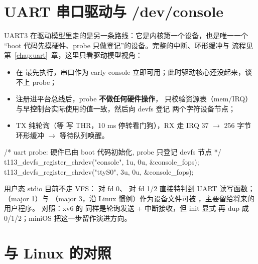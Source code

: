 \section{UART 串口驱动与 /dev/console}

UART3 在驱动模型里走的是另一条路线：它是内核第一个设备，也是唯一一个
``boot 代码先摸硬件、probe 只做登记''的设备。完整的中断、环形缓冲与
 流程见第~\ref{chap:uart}~章，这里只看驱动模型视角：

\begin{itemize}
  \item {} 在  最先执行，串口作为
        early console 立即可用；此时驱动核心还没起来，谈不上 probe；
  \item {} 注册进平台总线后，probe \textbf{不做任何硬件操作}，
        只校验资源表（mem/IRQ）与早控制台实际使用的值一致，然后向 devfs 登记
        两个字符设备节点；
  \item TX 纯轮询（等  写 THR，10 ms 停转看门狗），RX 走
        IRQ 37 $\rightarrow$ 256 字节环形缓冲 $\rightarrow$ 等待队列唤醒。
\end{itemize}

\begin{ccode}
/* uart probe: 硬件已由 boot 代码初始化, probe 只登记 devfs 节点 */
t113_devfs_register_chrdev("console", 1u, 0u, &console_fops);
t113_devfs_register_chrdev("ttyS0",   3u, 0u, &console_fops);
\end{ccode}

用户态 stdio 目前不走 VFS： 对 fd 0、 对 fd 1/2
直接特判到 UART 读写函数；（major 1）与 
（major 3，沿 Linux 惯例）作为设备文件可被 ，主要留给将来的用户程序。
对照：xv6 的  同样是轮询发送 + 中断接收，但 init 显式
 再 dup 成 0/1/2；miniOS 把这一步留作演进方向。

\section{与 Linux 的对照}

